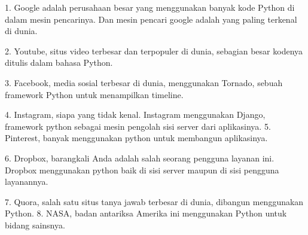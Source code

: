 1.	Google adalah perusahaan besar yang menggunakan banyak kode Python     di dalam mesin pencarinya. Dan 			mesin pencari google adalah     yang paling terkenal di dunia.

2.	Youtube, situs video terbesar dan terpopuler di dunia, sebagian         besar kodenya ditulis dalam bahasa Python.

3.	Facebook, media sosial terbesar di dunia, menggunakan Tornado, sebuah framework Python untuk 				menampilkan timeline.

4.	Instagram, siapa yang tidak kenal. Instagram menggunakan Django,        framework python sebagai mesin 			pengolah sisi server dari       aplikasinya.
5.	Pinterest, banyak menggunakan python untuk membangun aplikasinya.

6.	Dropbox, barangkali Anda adalah salah seorang pengguna layanan ini.     Dropbox menggunakan python baik di 	sisi server maupun di sisi          pengguna layanannya.

7.	Quora, salah satu situs tanya jawab terbesar di dunia, dibangun         menggunakan Python.
8.	NASA, badan antariksa Amerika ini menggunakan Python untuk bidang       sainsnya.
